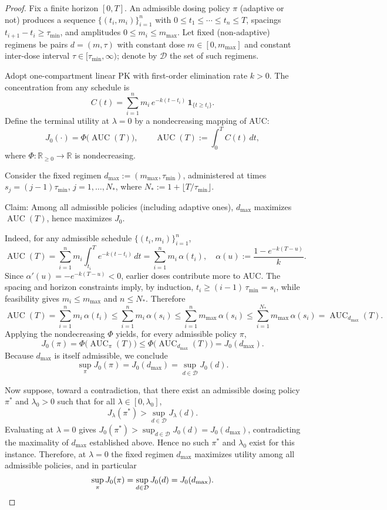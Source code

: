 \begin{proof}
Fix a finite horizon $[0,T]$. An admissible dosing policy $\pi$ (adaptive or not) produces a sequence $\{(t_i,m_i)\}_{i=1}^n$ with $0\le t_1\le\cdots\le t_n\le T$, spacings $t_{i+1}-t_i\ge \tau_{\min}$, and amplitudes $0\le m_i\le m_{\max}$. Let fixed (non-adaptive) regimens be pairs $d=(m,\tau)$ with constant dose $m\in[0,m_{\max}]$ and constant inter-dose interval $\tau\in[\tau_{\min},\infty)$; denote by $\mathcal D$ the set of such regimens.

Adopt one-compartment linear PK with first-order elimination rate $k>0$. The concentration from any schedule is
\[
C(t)=\sum_{i=1}^n m_i\,e^{-k(t-t_i)}\,\mathbf{1}_{\{t\ge t_i\}}.
\]
Define the terminal utility at $\lambda=0$ by a nondecreasing mapping of AUC:
\[
J_0(\cdot)=\Phi\big(\operatorname{AUC}(T)\big),\qquad \operatorname{AUC}(T):=\int_0^T C(t)\,dt,
\]
where $\Phi:\mathbb R_{\ge0}\to\mathbb R$ is nondecreasing.

Consider the fixed regimen $d_{\max}:=(m_{\max},\tau_{\min})$, administered at times $s_j=(j-1)\tau_{\min}$, $j=1,\dots, N_\ast$, where $N_\ast:=1+\lfloor T/\tau_{\min}\rfloor$.

Claim: Among all admissible policies (including adaptive ones), $d_{\max}$ maximizes $\operatorname{AUC}(T)$, hence maximizes $J_0$.

Indeed, for any admissible schedule $\{(t_i,m_i)\}_{i=1}^n$,
\[
\operatorname{AUC}(T)=\sum_{i=1}^n m_i\int_{t_i}^T e^{-k(t-t_i)}\,dt=\sum_{i=1}^n m_i\,\alpha(t_i),\quad \alpha(u):=\frac{1-e^{-k(T-u)}}{k}.
\]
Since $\alpha'(u)=-e^{-k(T-u)}<0$, earlier doses contribute more to AUC. The spacing and horizon constraints imply, by induction, $t_i\ge (i-1)\,\tau_{\min}=s_i$, while feasibility gives $m_i\le m_{\max}$ and $n\le N_\ast$. Therefore
\[
\operatorname{AUC}(T)=\sum_{i=1}^n m_i\,\alpha(t_i)\le\sum_{i=1}^n m_i\,\alpha(s_i)\le\sum_{i=1}^n m_{\max}\,\alpha(s_i)\le\sum_{i=1}^{N_\ast} m_{\max}\,\alpha(s_i)=\operatorname{AUC}_{d_{\max}}(T).
\]
Applying the nondecreasing $\Phi$ yields, for every admissible policy $\pi$,
\[
J_0(\pi)=\Phi\big(\operatorname{AUC}_\pi(T)\big)\le \Phi\big(\operatorname{AUC}_{d_{\max}}(T)\big)=J_0(d_{\max}).
\]
Because $d_{\max}$ is itself admissible, we conclude
\[
\sup_{\pi} J_0(\pi)=J_0(d_{\max})=\sup_{d\in\mathcal D} J_0(d).
\]

Now suppose, toward a contradiction, that there exist an admissible dosing policy $\pi^*$ and $\lambda_0>0$ such that for all $\lambda\in[0,\lambda_0]$,
\[
J_\lambda(\pi^*)>\sup_{d\in\mathcal D} J_\lambda(d).
\]
Evaluating at $\lambda=0$ gives $J_0(\pi^*)>\sup_{d\in\mathcal D} J_0(d)=J_0(d_{\max})$, contradicting the maximality of $d_{\max}$ established above. Hence no such $\pi^*$ and $\lambda_0$ exist for this instance. Therefore, at $\lambda=0$ the fixed regimen $d_{\max}$ maximizes utility among all admissible policies, and in particular
\[
\sup_{\pi} J_0(\pi)=\sup_{d\in\mathcal D} J_0(d)=J_0(d_{\max}).\qedhere
\]
\end{proof}
